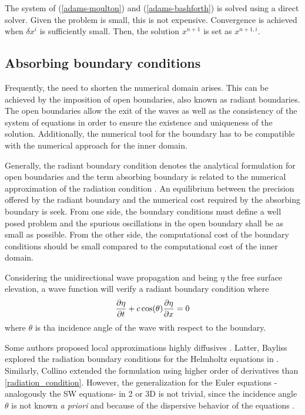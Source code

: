 The system of (\ref{adams-moulton}) and (\ref{adams-bashforth}) is solved using a direct solver. Given the problem is small, this is not expensive.
Convergence is achieved when $\delta x^i$ is sufficiently small. Then, the solution $x^{n+1}$ is set as $x^{n+1,i}$.





\subsection{Absorbing boundary conditions}
\label{eulerian_bsq_absorbing}


Frequently, the need to shorten the numerical domain arises. This can be achieved by the imposition of open boundaries, also known as radiant boundaries. The open boundaries allow the exit of the waves as well as the consistency of the system of equations in order to ensure the existence and uniqueness of the solution. Additionally, the numerical tool for the boundary has to be compatible with the numerical approach for the inner domain.

Generally, the radiant boundary condition denotes the analytical formulation for open boundaries and the term absorbing boundary is related to the numerical approximation of the radiation condition \cite{navon2004}. An equilibrium between the precision offered by the radiant boundary and the numerical cost required by the absorbing boundary is seek.
From one side, the boundary conditions must define a well posed problem and the spurious oscillations in the open boundary shall be as small as possible. From the other side, the computational cost of the boundary conditions should be small compared to the computational cost of the inner domain.

Considering the unidirectional wave propagation and being $\eta$ the free surface elevation, a wave function will verify a radiant boundary condition where
\begin{equation} \label{radiation_condition}
    \frac{\partial\eta}{\partial t} + c \cos(\theta)\frac{\partial\eta}{\partial x} = 0
\end{equation}
where $\theta$ is tha incidence angle of the wave with respect to the boundary.

Some authors proposed local approximations highly diffusives \cite{engquist1977}. Latter, Bayliss explored the radiation boundary conditions for the Helmholtz equations in \cite{bayliss1982}.
Similarly, Collino \cite{collino1993} extended the formulation using higher order of derivatives than \ref{radiation_condition}. However, the generalization for the Euler equations -analogously the SW equations- in 2 or 3D is not trivial, since the incidence angle $\theta$ is not known \emph{a priori} and because of the dispersive behavior of the equations \cite{wei1995}.

